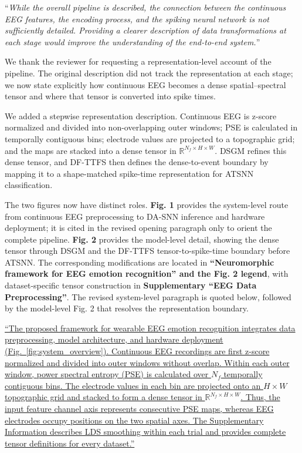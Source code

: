 \documentclass[12pt,technote,onecolumn]{IEEEtran}
\begin{document}
\vspace{4mm}

``{\it While the overall pipeline is described, the connection between the
continuous EEG features, the encoding process, and the spiking neural
network is not sufficiently detailed. Providing a clearer description of
data transformations at each stage would improve the understanding of
the end-to-end system.}''
\vspace{1mm}


We thank the reviewer for requesting a representation-level account of the pipeline. The original description did not track the representation at each stage; we now state explicitly how continuous EEG becomes a dense spatial--spectral tensor and where that tensor is converted into spike times.

We added a stepwise representation description. Continuous EEG is
z-score normalized and divided into non-overlapping outer windows; PSE
is calculated in temporally contiguous bins; electrode values are
projected to a topographic grid; and the maps are stacked into a dense
tensor in \(\mathbb{R}^{N_f\times H\times W}\). DSGM refines this dense
tensor, and DF-TTFS then defines the dense-to-event boundary by mapping
it to a shape-matched spike-time representation for ATSNN
classification.



The two figures now have distinct roles. \textbf{Fig. 1} provides the system-level route from continuous EEG preprocessing to DA-SNN inference and hardware deployment; it is cited in the revised opening paragraph only to orient the complete pipeline. \textbf{Fig. 2} provides the model-level detail, showing the dense tensor through DSGM and the DF-TTFS tensor-to-spike-time boundary before ATSNN. The corresponding modifications are located in \textbf{``Neuromorphic framework for EEG emotion recognition'' and the Fig. 2 legend}, with dataset-specific tensor construction in \textbf{Supplementary ``EEG Data Preprocessing''}. The revised system-level paragraph is quoted below, followed by the model-level Fig. 2 that resolves the representation boundary.

\uline{``The proposed framework for wearable EEG emotion recognition integrates data preprocessing, model architecture, and hardware deployment (Fig.~\ref{fig:system_overview}). Continuous EEG recordings are first z-score normalized and divided into outer windows without overlap. Within each outer window, power spectral entropy (PSE) is calculated over $N_f$ temporally contiguous bins. The electrode values in each bin are projected onto an $H\times W$ topographic grid and stacked to form a dense tensor in $\mathbb{R}^{N_f\times H\times W}$. Thus, the input feature channel axis represents consecutive PSE maps, whereas EEG electrodes occupy positions on the two spatial axes. The Supplementary Information describes LDS smoothing within each trial and provides complete tensor definitions for every dataset.''}
\end{document}
